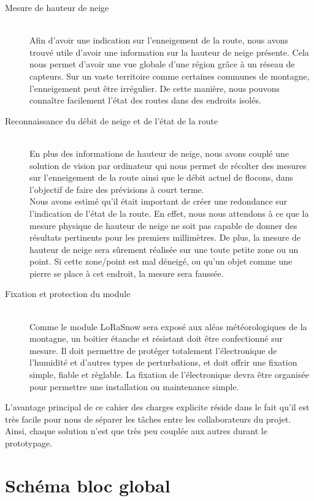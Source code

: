 \begin{description}
    \item[Mesure de hauteur de neige] \hfill \\ 
    Afin d'avoir une indication sur l'enneigement de la route, nous 
    avons trouvé utile d'avoir une information sur la hauteur de neige présente. Cela nous permet d'avoir 
    une vue globale d'une région grâce à un réseau de capteurs. Sur un vaste territoire comme certaines
    communes de montagne, l'enneigement peut être irrégulier. De cette manière, nous pouvons connaître 
    facilement l'état des routes dans des endroits isolés.
    \item[Reconnaissance du débit de neige et de l'état de la route] \hfill \\
    En plus des informations de hauteur de neige, nous avons couplé une solution de vision par ordinateur
    qui nous permet de récolter des mesures sur l'enneigement de la route ainsi que le débit actuel de
    flocons, dans l'objectif de faire des prévisions à court terme.\\
    Nous avons estimé qu'il était important de créer une redondance sur l'indication de l'état de la
    route. En effet, nous nous attendons à ce que la mesure physique de hauteur de neige ne soit pas 
    capable de donner des résultats pertinents pour les premiers millimètres. De plus, la mesure de
    hauteur de neige sera sûrement réalisée sur une toute petite zone ou un point.
    Si cette zone/point est mal déneigé, ou qu'un objet comme une pierre se place à cet endroit,
    la mesure sera faussée.
    \item[Fixation et protection du module] \hfill \\ 
    Comme le module LoRaSnow sera exposé aux aléas météorologiques de la montagne, un boitier étanche 
    et résistant doit être confectionné sur mesure. Il doit permettre de protéger totalement l'électronique de 
    l'humidité et d'autres types de perturbations, et doit offrir une fixation simple,
    fiable et règlable. La fixation de l'électronique devra être organisée pour permettre une
    installation ou maintenance simple.
\end{description}

L'avantage principal de ce cahier des charges explicite réside dans le fait qu'il est très facile pour
nous de séparer les tâches entre les collaborateurs du projet. Ainsi, chaque solution n'est que très 
peu couplée aux autres durant le prototypage.
\newpage

\section{Schéma bloc global}

